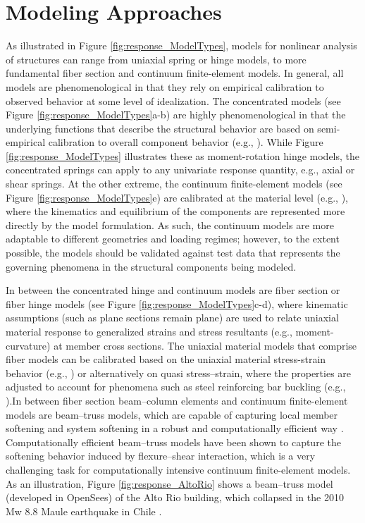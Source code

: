 \section{Modeling Approaches}
\label{sec:resp_struct_methods}

As illustrated in Figure \ref{fig:response_ModelTypes}, models for nonlinear analysis of structures can range from uniaxial spring or hinge models, to more fundamental fiber section and continuum finite-element models. In general, all models are phenomenological in that they rely on empirical calibration to observed behavior at some level of idealization. The concentrated models (see Figure \ref{fig:response_ModelTypes}a-b) are highly phenomenological in that the underlying functions that describe the structural behavior are based on semi-empirical calibration to overall component behavior (e.g., \cite{folz2001saws, lowes2003modeling, ibarra2005hysteretic, do2018damage}). While Figure \ref{fig:response_ModelTypes} illustrates these as moment-rotation hinge models, the concentrated springs can apply to any univariate response quantity, e.g., axial or shear springs. At the other extreme, the continuum finite-element models (see Figure \ref{fig:response_ModelTypes}e) are calibrated at the material level (e.g., \cite{lemaitre1990mechanics, lee1998plasticdamage, dettmer2004theoretical, maekawa2003nonlinear}), where the kinematics and equilibrium of the components are represented more directly by the model formulation. As such, the continuum models are more adaptable to different geometries and loading regimes; however, to the extent possible, the models should be validated against test data that represents the governing phenomena in the structural components being modeled.

In between the concentrated hinge and continuum models are fiber section or fiber hinge models (see Figure \ref{fig:response_ModelTypes}c-d), where kinematic assumptions (such as plane sections remain plane) are used to relate uniaxial material response to generalized strains and stress resultants (e.g., moment-curvature) at member cross sections. The uniaxial material models that comprise fiber models can be calibrated based on the uniaxial material stress-strain behavior (e.g., \cite{mander1988theoretical, dodd1995model, menegotto1973method, carreno2020material}) or alternatively on quasi stress--strain, where the properties are adjusted to account for phenomena such as steel reinforcing bar buckling (e.g., \cite{kunnath2009nonlinear, dhakal2002pathdependent}).In between fiber section beam--column elements and continuum finite-element models are beam--truss models, which are capable of capturing local member softening and system softening in a robust and computationally efficient way \citep{lu2014three, alvarez2020analysis}. Computationally efficient beam--truss models have been shown to capture the softening behavior induced by flexure--shear interaction, which is a very challenging task for computationally intensive continuum finite-element models. As an illustration, Figure \ref{fig:response_AltoRio} shows a beam--truss model (developed in OpenSees) of the Alto Rio building, which collapsed in the 2010 Mw 8.8 Maule earthquake in Chile \citep{zhang2017nonlinear}.

